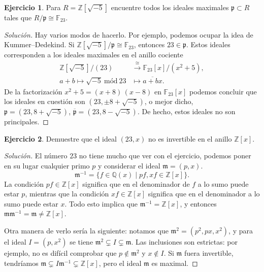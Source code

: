 \documentclass{article}
\newcounter{tarea}
\theoremstyle{definition}
\newtheorem{ejercicio}{Ejercicio}[tarea]
\newenvironment{solucion}{\begin{proof}[Solución]}{\end{proof}}
\newcommand{\ZZ}{\mathbb{Z}}
\newcommand{\QQ}{\mathbb{Q}}
\newcommand{\FF}{\mathbb{F}}
\begin{document}
\begin{ejercicio}
  Para $R = \mathbb{Z} [\sqrt{-5}]$ encuentre todos los ideales maximales
  $\mathfrak{p} \subset R$ tales que $R/\mathfrak{p} \cong \mathbb{F}_{23}$.

  \ifdefined\solutions
  \begin{solucion}
    Hay varios modos de hacerlo.  Por ejemplo, podemos ocupar la idea de
    Kummer–Dedekind. Si $\ZZ[\sqrt{-5}]/\mathfrak{p} \cong \FF_{23}$, entonces
    $23 \in \mathfrak{p}$. Estos ideales corresponden a los ideales maximales en
    el anillo cociente
    \begin{align*}
      \ZZ[\sqrt{-5}]/(23) & \xrightarrow{\cong} \FF_{23} [x]/(x^2 + 5),\\
      a + b \mapsto \sqrt{-5} ~\text{mód}~ 23 & \mapsto \overline{a + bx}.
    \end{align*}
    De la factorización $x^2 + 5 = (x + 8)\,(x - 8)$ en $\FF_{23} [x]$ podemos
    concluir que los ideales en cuestión son $(23, \pm 8+\sqrt{-5})$, o mejor
    dicho, $\mathfrak{p} = (23, 8 + \sqrt{-5})$,
    $\overline{\mathfrak{p}} = (23, 8 - \sqrt{-5})$. De hecho, estos ideales no
    son principales.
  \end{solucion}
  \fi
\end{ejercicio}

\begin{ejercicio}
  Demuestre que el ideal $(23,x)$ no es invertible en el anillo
  $\mathbb{Z} [x]$.

  \ifdefined\solutions
  \begin{solucion}
    El número $23$ no tiene mucho que ver con el ejercicio, podemos poner en su
    lugar cualquier primo $p$ y considerar el ideal $\mathfrak{m} = (p, x)$.
    $$\mathfrak{m}^{-1} = \{ f \in \QQ (x) \mid pf, xf \in \ZZ[x] \}.$$
    La condición $pf \in \ZZ[x]$ significa que en el denominador de $f$ a lo
    sumo puede estar $p$, mientras que la condición $xf \in \ZZ[x]$ significa
    que en el denominador a lo sumo puede estar $x$. Todo esto implica que
    $\mathfrak{m}^{-1} = \ZZ[x]$, y entonces
    $\mathfrak{m} \mathfrak{m}^{-1} = \mathfrak{m} \ne \ZZ[x]$.

    Otra manera de verlo sería la siguiente: notamos que
    $\mathfrak{m}^2 = (p^2, px, x^2)$, y para el ideal $I = (p, x^2)$ se tiene
    $\mathfrak{m}^2 \subsetneq I \subsetneq \mathfrak{m}$. Las inclusiones son
    estrictas: por ejemplo, no es difícil comprobar que
    $p \notin \mathfrak{m}^2$ y $x \notin I$. Si $\mathfrak{m}$ fuera
    invertible, tendríamos
    $\mathfrak{m} \subsetneq I \mathfrak{m}^{-1} \subsetneq \ZZ[x]$,
    pero el ideal $\mathfrak{m}$ es maximal.
  \end{solucion}
  \fi
\end{ejercicio}
\end{document}
